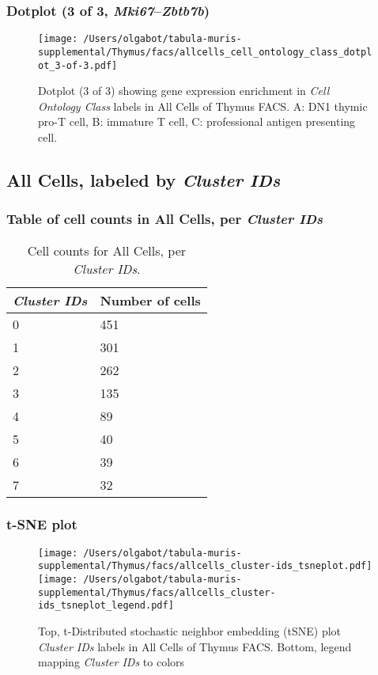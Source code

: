 \clearpage

\subsubsection{Dotplot (3 of 3, \emph{Mki67}--\emph{Zbtb7b})}
\begin{figure}[h]
\centering
\texttt{[image: /Users/olgabot/tabula-muris-supplemental/Thymus/facs/allcells\_cell\_ontology\_class\_dotplot\_3-of-3.pdf]}

\caption{ Dotplot (3 of 3)  showing gene expression enrichment in \emph{Cell Ontology Class} labels in All Cells of Thymus FACS. A: DN1 thymic pro-T cell, B: immature T cell, C: professional antigen presenting cell.}
\end{figure}


\clearpage

\subsection{All Cells, labeled by \emph{Cluster IDs}}
\subsubsection{Table of cell counts in All Cells, per \emph{Cluster IDs}}\begin{table}[h]
\centering
\label{my-label}
\begin{tabular}{@{}ll@{}}
\toprule

\emph{Cluster IDs}& Number of cells \\ \midrule
0 & 451 \\

1 & 301 \\

2 & 262 \\

3 & 135 \\

4 & 89 \\

5 & 40 \\

6 & 39 \\

7 & 32 \\
\bottomrule
\end{tabular}
\caption{Cell counts for All Cells, per \emph{Cluster IDs}.}
\end{table}

\clearpage
\subsubsection{t-SNE plot}
\begin{figure}[h]
\centering
\texttt{[image: /Users/olgabot/tabula-muris-supplemental/Thymus/facs/allcells\_cluster-ids\_tsneplot.pdf]}
\texttt{[image: /Users/olgabot/tabula-muris-supplemental/Thymus/facs/allcells\_cluster-ids\_tsneplot\_legend.pdf]}
\caption{Top, t-Distributed stochastic neighbor embedding (tSNE) plot  \emph{Cluster IDs} labels in All Cells of Thymus FACS. Bottom, legend mapping \emph{Cluster IDs} to colors}
\end{figure}


